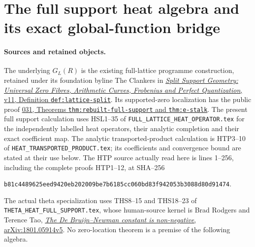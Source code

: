 \section{The full support heat algebra and its exact global-function bridge}
\label{sec:supported-heat-product}

\paragraph{Sources and retained objects.}
The underlying $G_L(R)$ is the existing full-lattice programme
construction, retained under its foundation byline The Clankers in
\href{https://github.com/KokunoYumeto/zeta-function-research-reader/blob/a2851f9eb352e7e4376bc629de86fa4ed9c1c434/workbenches/splitzero-tandem/foundations/split-support-geometry-v11/split_support_geometry_arithmetic_curve_v11.tex}{\emph{Split
Support Geometry: Universal Zero Fibres, Arithmetic Curves, Frobenius
and Perfect Quantization}, v11, Definition \texttt{def:lattice-split}}.
Its supported-zero localization has the public proof
\href{https://github.com/KokunoYumeto/zeta-function-research-reader/blob/3c78cfbd9e194d35117b33277c421c6564ce3dbf/workbenches/splitzero-tandem/continuations/20260923-full-prime-support/031/01_REBUILT_MATHEMATICS.tex}{031,
Theorems \texttt{thm:rebuilt-full-support} and \texttt{thm:e-stalk}}.
The present full support calculation uses HSL1--35 of
\nolinkurl{FULL_LATTICE_HEAT_OPERATOR.tex} for the independently
labelled heat operators, their analytic completion and their
exact coefficient map. The analytic transported-product calculation
is HTP3--10 of \nolinkurl{HEAT_TRANSPORTED_PRODUCT.tex}; its
coefficients and convergence bound are stated at their use below.
The HTP source actually read here is lines 1--256, including
the complete proofs HTP1--12, at SHA--256
\begin{center}\small
\nolinkurl{b81c4489625eed9420eb202009be7b6185cc060bd83f942053b3088d80d91474}.
\end{center}
The actual theta specialization uses THS8--15 and THS18--23
of \nolinkurl{THETA_HEAT_FULL_SUPPORT.tex}, whose human-source
kernel is Brad Rodgers and Terence Tao,
\href{https://arxiv.org/abs/1801.05914v5}{\emph{The De Bruijn--Newman
constant is non-negative}, arXiv:1801.05914v5}.
No zero-location theorem is a premise of the following algebra.

